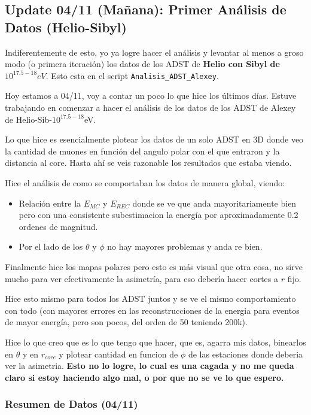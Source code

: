 \subsection*{Update 04/11 (Mañana): Primer Análisis de Datos (Helio-Sibyl)}

Indiferentemente de esto, yo ya logre hacer el análisis y levantar al menos a groso modo (o primera iteración) los datos de los ADST de \textbf{Helio con Sibyl de $10^{17.5-18}eV$}. Esto esta en el script \lstinline|Analisis_ADST_Alexey|. 

Hoy estamos a 04/11, voy a contar un poco lo que hice los últimos días. Estuve trabajando en comenzar a hacer el análisis de los datos de los ADST de Alexey de Helio-Sib-$10^{17.5-18}$eV. 

Lo que hice es esencialmente plotear los datos de un solo ADST en 3D donde veo la cantidad de muones en función del angulo polar con el que entraron y la distancia al core. Hasta ahí se veis razonable los resultados que estaba viendo.

Hice el análisis de como se comportaban los datos de manera global, viendo:

\begin{itemize}
	\item Relación entre la $E_{MC}$ y $E_{REC}$ donde se ve que anda mayoritariamente bien pero con una consistente subestimacion la energía por aproximadamente 0.2 ordenes de magnitud. 
	\item Por el lado de los $\theta$ y $\phi$ no hay mayores problemas y anda re bien.
\end{itemize}

Finalmente hice los mapas polares pero esto es más visual que otra cosa, no sirve mucho para ver efectivamente la asimetría, para eso debería hacer cortes a $r$ fijo.

Hice esto mismo para todos los ADST juntos y se ve el mismo comportamiento con todo (con mayores errores en las reconstrucciones de la energia para eventos de mayor energía, pero son pocos, del orden de 50 teniendo 200k).

Hice lo que creo que es lo que tengo que hacer, que es, agarra mis datos, binearlos en $\theta$ y en $r_{core}$ y plotear cantidad en funcion de $\phi$ de las estaciones donde deberia ver la asimetria. \textbf{Esto no lo logre, lo cual es una cagada y no me queda claro si estoy haciendo algo mal, o por que no se ve lo que espero.}

\subsubsection*{Resumen de Datos (04/11)}

